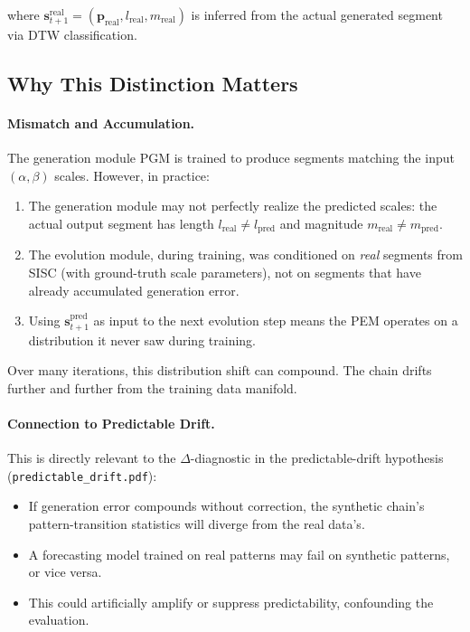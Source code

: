where $\mathbf{s}_{t+1}^{\text{real}} = (\mathbf{p}_{\text{real}}, l_{\text{real}}, m_{\text{real}})$ is inferred from the actual generated segment via DTW classification.

\subsection{Why This Distinction Matters}

\paragraph{Mismatch and Accumulation.} The generation module PGM is trained to produce segments matching the input $(\alpha, \beta)$ scales. However, in practice:
\begin{enumerate}[leftmargin=*,topsep=2pt,itemsep=2pt]
  \item The generation module may not perfectly realize the predicted scales: the actual output segment has length $l_{\text{real}} \neq l_{\text{pred}}$ and magnitude $m_{\text{real}} \neq m_{\text{pred}}$.
  \item The evolution module, during training, was conditioned on \emph{real} segments from SISC (with ground-truth scale parameters), not on segments that have already accumulated generation error.
  \item Using $\mathbf{s}_{t+1}^{\text{pred}}$ as input to the next evolution step means the PEM operates on a distribution it never saw during training.
\end{enumerate}

Over many iterations, this distribution shift can compound. The chain drifts further and further from the training data manifold.

\paragraph{Connection to Predictable Drift.} This is directly relevant to the $\Delta$-diagnostic in the predictable-drift hypothesis (\texttt{predictable\_drift.pdf}):
\begin{itemize}[leftmargin=*,topsep=2pt,itemsep=2pt]
  \item If generation error compounds without correction, the synthetic chain's pattern-transition statistics will diverge from the real data's.
  \item A forecasting model trained on real patterns may fail on synthetic patterns, or vice versa.
  \item This could artificially amplify or suppress predictability, confounding the evaluation.
\end{itemize}

